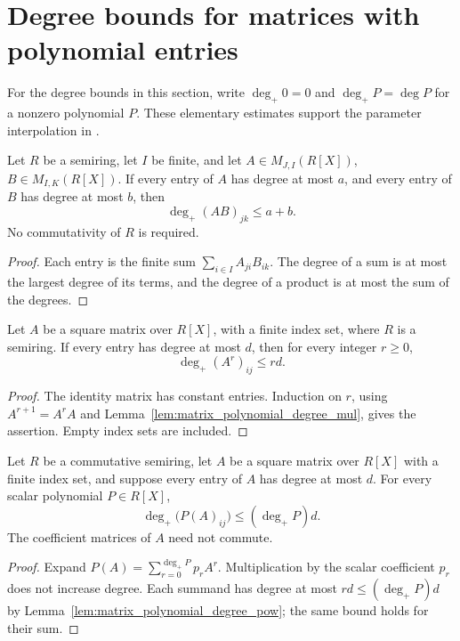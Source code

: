 \section{Degree bounds for matrices with polynomial entries}
\label{sec:matrix_polynomial_degree}

For the degree bounds in this section, write $\deg_+0=0$ and
$\deg_+P=\deg P$ for a nonzero polynomial $P$. These elementary estimates
support the parameter interpolation in
\cite[Proposition~5.7 and Theorem~5.8]{Arad2016RigorousRG}.

\begin{lemma}
    \label{lem:matrix_polynomial_degree_mul}
    \leanok
    Let $R$ be a semiring, let $I$ be finite, and let
    $A\in M_{J,I}(R[X])$, $B\in M_{I,K}(R[X])$.
    If every entry of $A$ has degree at most $a$, and every entry of $B$
    has degree at most $b$, then
    \[
        \deg_+ (AB)_{jk}\leq a+b.
    \]
    No commutativity of $R$ is required.
\end{lemma}
\begin{proof}\leanok
    Each entry is the finite sum $\sum_{i\in I}A_{ji}B_{ik}$.
    The degree of a sum is at most the largest degree of its terms,
    and the degree of a product is at most the sum of the degrees.
\end{proof}

\begin{lemma}
    \label{lem:matrix_polynomial_degree_pow}
    \leanok
    Let $A$ be a square matrix over $R[X]$, with a finite index set,
    where $R$ is a semiring. If every entry has degree at most $d$, then
    for every integer $r\geq0$,
    \[
        \deg_+ (A^r)_{ij}\leq rd.
    \]
\end{lemma}
\begin{proof}\leanok
    The identity matrix has constant entries. Induction on $r$, using
    $A^{r+1}=A^rA$ and Lemma~\ref{lem:matrix_polynomial_degree_mul},
    gives the assertion. Empty index sets are included.
\end{proof}

\begin{lemma}
    \label{lem:matrix_polynomial_degree_aeval}
    \leanok
    Let $R$ be a commutative semiring, let $A$ be a square matrix over
    $R[X]$ with a finite index set, and suppose every entry of $A$ has
    degree at most $d$. For every scalar polynomial $P\in R[X]$,
    \[
        \deg_+\bigl(P(A)_{ij}\bigr)\leq (\deg_+P)d.
    \]
    The coefficient matrices of $A$ need not commute.
\end{lemma}
\begin{proof}\leanok
    Expand $P(A)=\sum_{r=0}^{\deg_+P}p_rA^r$.
    Multiplication by the scalar coefficient $p_r$ does not increase
    degree. Each summand has degree at most $rd\leq(\deg_+P)d$ by
    Lemma~\ref{lem:matrix_polynomial_degree_pow}; the same bound holds
    for their sum.
\end{proof}
